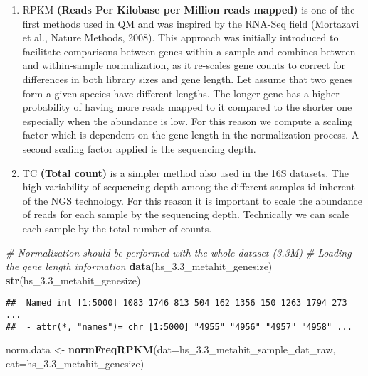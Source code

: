 \documentclass[]{article}
\newenvironment{Shaded}{\begin{snugshade}}{\end{snugshade}}
\newcommand{\KeywordTok}[1]{\textcolor[rgb]{0.13,0.29,0.53}{\textbf{{#1}}}}
\newcommand{\DataTypeTok}[1]{\textcolor[rgb]{0.13,0.29,0.53}{{#1}}}
\newcommand{\StringTok}[1]{\textcolor[rgb]{0.31,0.60,0.02}{{#1}}}
\newcommand{\CommentTok}[1]{\textcolor[rgb]{0.56,0.35,0.01}{\textit{{#1}}}}
\newcommand{\NormalTok}[1]{{#1}}
\providecommand{\tightlist}{%
  \setlength{\itemsep}{0pt}\setlength{\parskip}{0pt}}
\begin{document}
\begin{enumerate}
\def\labelenumi{\arabic{enumi}.}
\tightlist
\item
  RPKM \textbf{(Reads Per Kilobase per Million reads mapped)} is one of
  the first methods used in QM and was inspired by the RNA-Seq field
  (Mortazavi et al., Nature Methods, 2008). This approach was initially
  introduced to facilitate comparisons between genes within a sample and
  combines between- and within-sample normalization, as it re-scales
  gene counts to correct for differences in both library sizes and gene
  length. Let assume that two genes form a given species have different
  lengths. The longer gene has a higher probability of having more reads
  mapped to it compared to the shorter one especially when the abundance
  is low. For this reason we compute a scaling factor which is dependent
  on the gene length in the normalization process. A second scaling
  factor applied is the sequencing depth.\\
\item
  TC \textbf{(Total count)} is a simpler method also used in the 16S
  datasets. The high variability of sequencing depth among the different
  samples id inherent of the NGS technology. For this reason it is
  important to scale the abundance of reads for each sample by the
  sequencing depth. Technically we can scale each sample by the total
  number of counts.
\end{enumerate}

\begin{Shaded}
\begin{Highlighting}[]
\CommentTok{# Normalization should be performed with the whole dataset (3.3M) }
\CommentTok{# Loading the gene length information}
\KeywordTok{data}\NormalTok{(hs_3.3_metahit_genesize)}
\KeywordTok{str}\NormalTok{(hs_3.3_metahit_genesize)}
\end{Highlighting}
\end{Shaded}

\begin{verbatim}
##  Named int [1:5000] 1083 1746 813 504 162 1356 150 1263 1794 273 ...
##  - attr(*, "names")= chr [1:5000] "4955" "4956" "4957" "4958" ...
\end{verbatim}

\begin{Shaded}
\begin{Highlighting}[]
\NormalTok{norm.data <-}\StringTok{ }\KeywordTok{normFreqRPKM}\NormalTok{(}\DataTypeTok{dat=}\NormalTok{hs_3.3_metahit_sample_dat_raw, }
                          \DataTypeTok{cat=}\NormalTok{hs_3.3_metahit_genesize)}
\end{Highlighting}
\end{Shaded}
\end{document}
